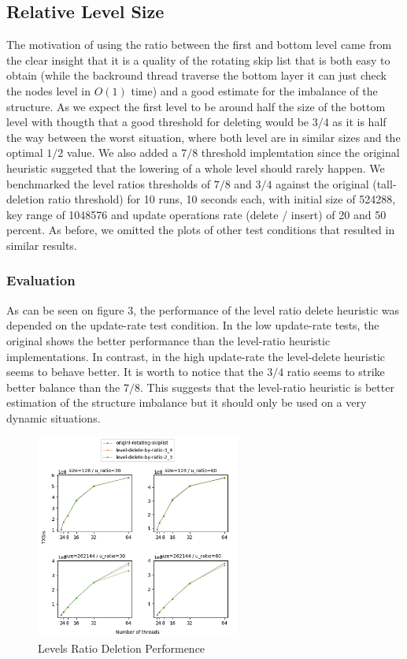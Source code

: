 \documentclass{article}
\begin{document}
\subsection{Relative Level Size}
\label{ssec:rls}

The motivation of using the ratio between the first and bottom level came from the clear insight that it is a quality of the rotating skip list that is both easy to obtain (while the backround thread traverse the bottom layer it can just check the nodes level in $O(1)$ time) and a good estimate for the imbalance of the structure. As we expect the first level to be around half the size of the bottom level with thougth that a good threshold for deleting would be $3/4$ as it is half the way between the worst situation, where both level are in similar sizes and the optimal $1/2$ value. We also added a $7/8$ threshold implemtation since the original heuristic suggeted that the lowering of a whole level should rarely happen. We benchmarked the level ratios thresholds of $7/8$ and $3/4$ against the original (tall-deletion ratio threshold) for 10 runs, 10 seconds each, with initial size of 524288, key range of 1048576 and update operations rate (delete / insert) of 20 and 50 percent. As before, we omitted the plots of other test conditions that resulted in similar results. 

\subsubsection{Evaluation}
\label{sssec:rls-evl}

As can be seen on figure 3, the performance of the level ratio delete heuristic was depended on the update-rate test condition. In the low update-rate tests, the original shows the better performance than the level-ratio heuristic implementations. In contrast, in the high update-rate the level-delete heuristic seems to behave better. It is worth to notice that the $3/4$ ratio seems to strike better balance than the $7/8$. This suggests that the level-ratio heuristic is better estimation of the structure imbalance but it should only be used on a very dynamic situations.

\begin{figure}
	\caption{Levels Ratio Deletion Performence}
	\centering
	\includegraphics[width=0.6\textwidth]{level-delete-by-ratio_plot}
\end{figure}
\end{document}
